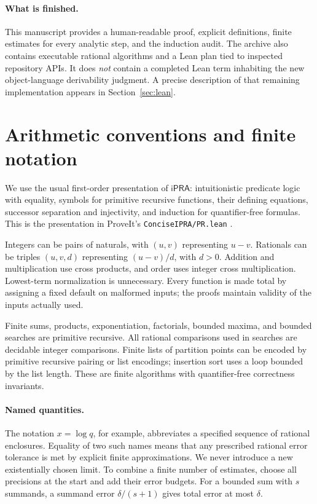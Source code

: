 \documentclass[11pt]{article}
\theoremstyle{definition}
\newcommand{\ipra}{\mathsf{iPRA}}
\begin{document}
\paragraph{What is finished.}
This manuscript provides a human-readable proof, explicit definitions,
finite estimates for every analytic step, and the induction audit. The
archive also contains executable rational algorithms and a Lean plan tied
to inspected repository APIs. It does \emph{not} contain a completed Lean
term inhabiting the new object-language derivability judgment. A precise
description of that remaining implementation appears in
Section~\ref{sec:lean}.

\section{Arithmetic conventions and finite notation}
\label{sec:arith}

We use the usual first-order presentation of $\ipra$: intuitionistic
predicate logic with equality, symbols for primitive recursive functions,
their defining equations, successor separation and injectivity, and
induction for quantifier-free formulas. This is the presentation in
ProveIt's \texttt{ConciseIPRA/PR.lean} \cite{ProveItPR}.

Integers can be pairs of naturals, with $(u,v)$ representing $u-v$.
Rationals can be triples $(u,v,d)$ representing $(u-v)/d$, with $d>0$.
Addition and multiplication use cross products, and order uses integer
cross multiplication. Lowest-term normalization is unnecessary. Every
function is made total by assigning a fixed default on malformed inputs;
the proofs maintain validity of the inputs actually used.

Finite sums, products, exponentiation, factorials, bounded maxima, and
bounded searches are primitive recursive. All rational comparisons used in
searches are decidable integer comparisons. Finite lists of partition
points can be encoded by primitive recursive pairing or list encodings;
insertion sort uses a loop bounded by the list length. These are finite
algorithms with quantifier-free correctness invariants.

\paragraph{Named quantities.}
The notation $x=\log q$, for example, abbreviates a specified sequence of
rational enclosures. Equality of two such names means that any prescribed
rational error tolerance is met by explicit finite approximations. We
never introduce a new existentially chosen limit. To combine a finite
number of estimates, choose all precisions at the start and add their
error budgets. For a bounded sum with $s$ summands, a summand error
$\delta/(s+1)$ gives total error at most $\delta$.
\end{document}
